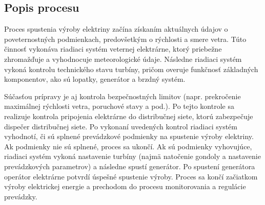\documentclass[12pt,a4paper]{article}
\begin{document}
\subsection{Popis procesu}
Proces spustenia výroby elektriny začína získaním aktuálnych údajov o poveternostných podmienkach, predovšetkým o rýchlosti a smere vetra. Túto činnosť vykonáva riadiaci systém veternej elektrárne, ktorý priebežne zhromažďuje a vyhodnocuje meteorologické údaje. Následne riadiaci systém vykoná kontrolu technického stavu turbíny, pričom overuje funkčnosť základných komponentov, ako sú lopatky, generátor a brzdný systém.

Súčasťou prípravy je aj kontrola bezpečnostných limitov (napr. prekročenie maximálnej rýchlosti vetra, poruchové stavy a pod.). Po tejto kontrole sa realizuje kontrola pripojenia elektrárne do distribučnej siete, ktorú zabezpečuje dispečer distribučnej siete. Po vykonaní uvedených kontrol riadiaci systém vyhodnotí, či sú splnené prevádzkové podmienky na spustenie výroby elektriny. Ak podmienky nie sú splnené, proces sa ukončí. Ak sú podmienky vyhovujúce, riadiaci systém vykoná nastavenie turbíny (najmä natočenie gondoly a nastavenie prevádzkových parametrov) a následne spustí generátor. Po spustení generátora operátor elektrárne potvrdí úspešné spustenie výroby. Proces sa končí začiatkom výroby elektrickej energie a prechodom do procesu monitorovania a regulácie prevádzky.
\end{document}
